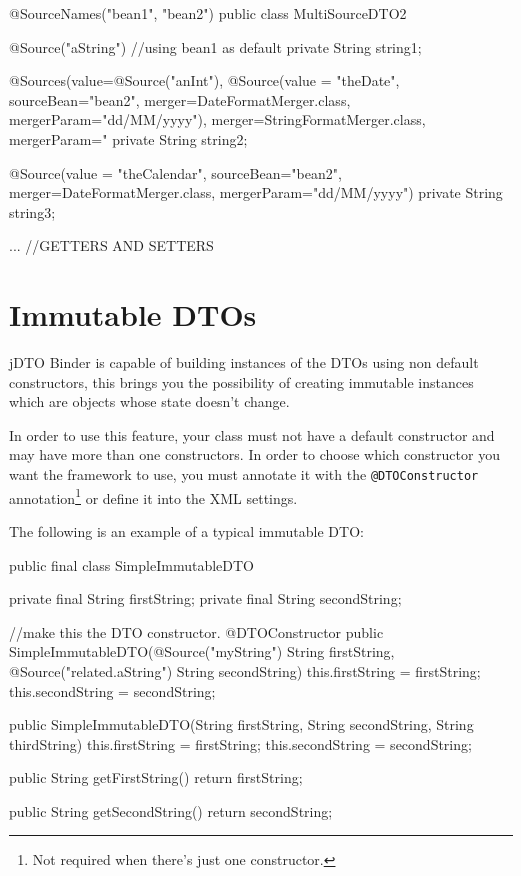 \documentclass[11pt]{article}
\newcommand{\JDTO}{jDTO Binder\xspace}
\begin{document}
\begin{java}
@SourceNames({"bean1", "bean2"})
public class MultiSourceDTO2 {
    @Source("aString") //using bean1 as default
    private String string1;
    
    @Sources(value={@Source("anInt"), 
            @Source(value = "theDate", 
            sourceBean="bean2", 
            merger=DateFormatMerger.class, 
            mergerParam="dd/MM/yyyy")}, 
        merger=StringFormatMerger.class, mergerParam="%
    private String string2;
    
    @Source(value = "theCalendar", sourceBean="bean2", 
        merger=DateFormatMerger.class, mergerParam="dd/MM/yyyy")
    private String string3;

    ... //GETTERS AND SETTERS
}
\end{java}

\clearpage

\section{Immutable DTOs}

\JDTO is capable of building instances of the DTOs using non default constructors, this brings you the possibility of creating immutable instances which
 are objects whose state doesn't change.
 
In order to use this feature, your class must not have a default constructor and may have more than one constructors. In order to choose which constructor you want the framework to use, you must annotate it with the \texttt{@DTOConstructor} annotation\footnote{Not required when there's just one constructor.} or define it into the XML settings.

The following is an example of a typical immutable DTO:

\begin{java}
public final class SimpleImmutableDTO {
    private final String firstString;
    private final String secondString;
    
    //make this the DTO constructor.
    @DTOConstructor
    public SimpleImmutableDTO(@Source("myString") String firstString, @Source("related.aString") String secondString) {
        this.firstString = firstString;
        this.secondString = secondString;
    }
    
    public SimpleImmutableDTO(String firstString, String secondString, String thirdString) {
        this.firstString = firstString;
        this.secondString = secondString;
    }
    
    public String getFirstString() {
        return firstString;
    }

    public String getSecondString() {
        return secondString;
    }    
}
\end{java}
\end{document}
